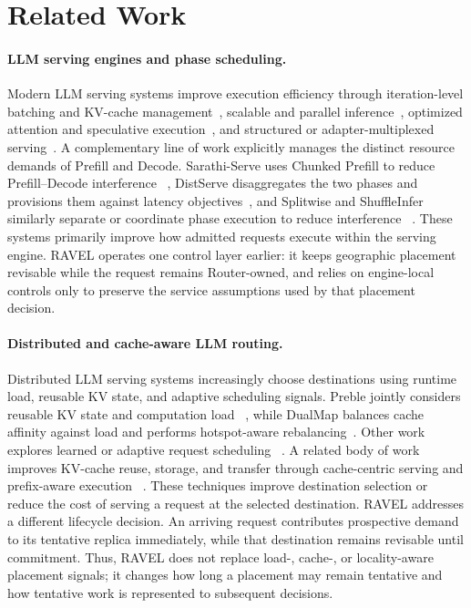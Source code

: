 \section{Related Work}
\label{sec:related}

\paragraph{LLM serving engines and phase scheduling.}
Modern LLM serving systems improve execution efficiency through
iteration-level batching and KV-cache management~\cite{orca,vllm},
scalable and parallel inference~\cite{pope_scaling_inference,
deepspeed_inference,alpaserve,loongserve}, optimized attention and
speculative execution~\cite{flashattention2,specinfer}, and structured or
adapter-multiplexed serving~\cite{sglang,slora}.
A complementary line of work explicitly manages the distinct resource demands
of Prefill and Decode.
Sarathi-Serve uses Chunked Prefill to reduce Prefill--Decode interference
~\cite{sarathi}, DistServe disaggregates the two phases and provisions them
against latency objectives~\cite{distserve}, and Splitwise and ShuffleInfer
similarly separate or coordinate phase execution to reduce interference
~\cite{splitwise,shuffleinfer}.
These systems primarily improve how admitted requests execute within the
serving engine.
RAVEL operates one control layer earlier: it keeps geographic placement
revisable while the request remains Router-owned, and relies on engine-local
controls only to preserve the service assumptions used by that placement
decision.

\paragraph{Distributed and cache-aware LLM routing.}
Distributed LLM serving systems increasingly choose destinations using runtime
load, reusable KV state, and adaptive scheduling signals.
Preble jointly considers reusable KV state and computation load
~\cite{preble}, while DualMap balances cache affinity against load and performs
hotspot-aware rebalancing~\cite{dualmap}.
Other work explores learned or adaptive request scheduling
~\cite{llm_learning_to_rank,simple_is_better,lodestar}.
A related body of work improves KV-cache reuse, storage, and transfer through
cache-centric serving and prefix-aware execution
~\cite{mooncake,cachedattention,infinigen,cachecraft,chunkattention,
cacheblend,kvlink}.
These techniques improve destination selection or reduce the cost of serving a
request at the selected destination.
RAVEL addresses a different lifecycle decision.
An arriving request contributes prospective demand to its tentative replica
immediately, while that destination remains revisable until commitment.
Thus, RAVEL does not replace load-, cache-, or locality-aware placement signals;
it changes how long a placement may remain tentative and how tentative work is
represented to subsequent decisions.

